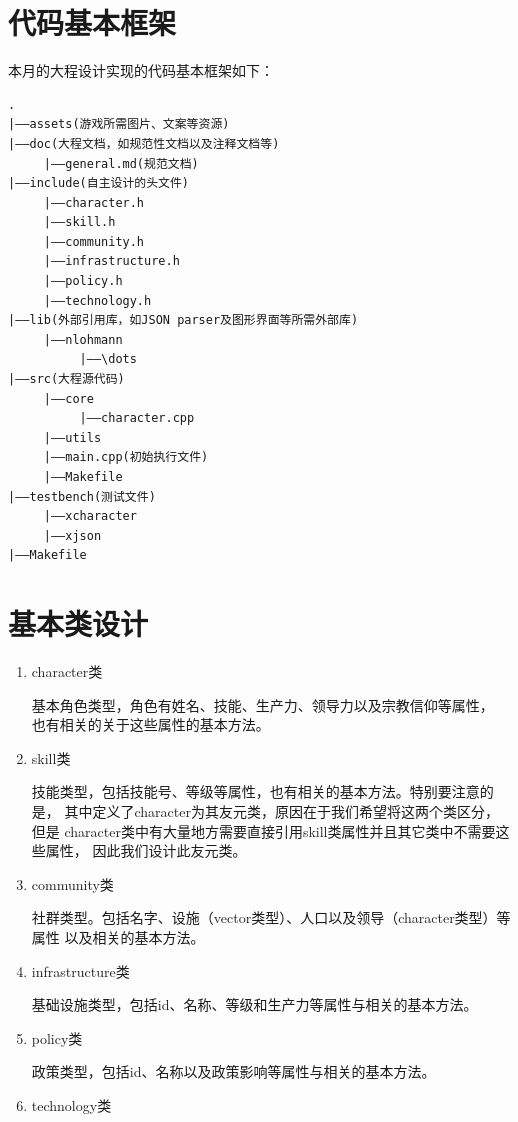 \documentclass[UTF8]{ctexart}
\begin{document}
    \section{代码基本框架}
    本月的大程设计实现的代码基本框架如下：
\begin{lstlisting}
.
|——assets(游戏所需图片、文案等资源)
|——doc(大程文档，如规范性文档以及注释文档等)
     |——general.md(规范文档)
|——include(自主设计的头文件)
     |——character.h
     |——skill.h
     |——community.h
     |——infrastructure.h
     |——policy.h
     |——technology.h
|——lib(外部引用库，如JSON parser及图形界面等所需外部库)
     |——nlohmann
          |——\dots
|——src(大程源代码)
     |——core
          |——character.cpp
     |——utils
     |——main.cpp(初始执行文件)
     |——Makefile
|——testbench(测试文件)
     |——xcharacter
     |——xjson
|——Makefile
\end{lstlisting}
    
    \section{基本类设计}
    \begin{enumerate}
        \item character类
        
        基本角色类型，角色有姓名、技能、生产力、领导力以及宗教信仰等属性，
        也有相关的关于这些属性的基本方法。
        \item skill类
        
        技能类型，包括技能号、等级等属性，也有相关的基本方法。特别要注意的是，
        其中定义了character为其友元类，原因在于我们希望将这两个类区分，但是
        character类中有大量地方需要直接引用skill类属性并且其它类中不需要这些属性，
        因此我们设计此友元类。
        \item community类
        
        社群类型。包括名字、设施（vector类型）、人口以及领导（character类型）等属性
        以及相关的基本方法。
        \item infrastructure类
        
        基础设施类型，包括id、名称、等级和生产力等属性与相关的基本方法。
        \item policy类
        
        政策类型，包括id、名称以及政策影响等属性与相关的基本方法。
        \item technology类

    \end{enumerate}
\end{document}
